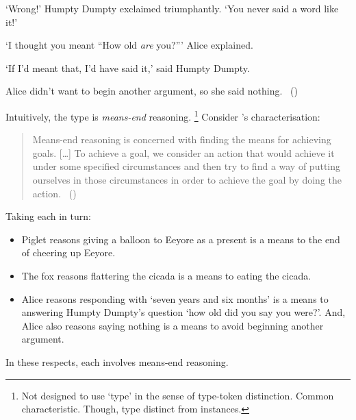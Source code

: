 \begin{note}
\begin{scenario}
    \noindent%
    `Wrong!'
    Humpty Dumpty exclaimed triumphantly.
    `You never said a word like it!'

    \noindent%
    `I thought you meant ``How old \emph{are} you?'''
    Alice explained.

    \noindent%
    `If I'd meant that, I'd have said it,'
    said Humpty Dumpty.

    \noindent%
    Alice didn't want to begin another argument, so she said nothing.\newline
    \mbox{ }\hfill\mbox{(\cite[188]{Carroll:2009aa})}\newline
    \mbox{ }
  \end{scenario}
\end{note}

\begin{note}
  Intuitively, the type is \emph{means-end} reasoning.%
  \footnote{
    Not designed to use `type' in the sense of type-token distinction.
    Common characteristic.
    Though, type distinct from instances.
  }
  Consider \citeauthor{Pollock:2002aa}'s characterisation:

  \begin{quote}
    Means-end reasoning is concerned with finding the means for achieving goals.
    [\dots]
    To achieve a goal, we consider an action that would achieve it under some specified circumstances and then try to find a way of putting ourselves in those circumstances in order to achieve the goal by doing the action.%
    \mbox{ }\hfill\mbox{(\citeyear[60]{Pollock:2002aa})}
  \end{quote}

  \noindent%
  Taking each  in turn:
  \begin{itemize}
  \item
    Piglet reasons giving a balloon to Eeyore as a present is a means to the end of cheering up Eeyore.
  \item
    The fox reasons flattering the cicada is a means to eating the cicada.
  \item
    Alice reasons responding with `seven years and six months' is a means to answering Humpty Dumpty's question `how old did you say you were?'.
    And, Alice also reasons saying nothing is a means to avoid beginning another argument.
  \end{itemize}

  \noindent%
  In these respects, each  involves means-end reasoning.
\end{note}

